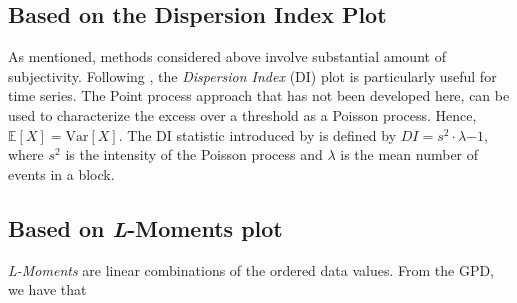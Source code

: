 




\subsection*{Based on the Dispersion Index Plot}

As mentioned, methods considered above involve substantial amount of subjectivity.
Following \citet{ribatet_users_2006}, the \emph{Dispersion Index} (DI) plot is particularly useful for time series. The Point process approach that has not been developed here, can be used to characterize the excess over a threshold as a Poisson process. Hence, $\mathbb{E}[X]=\text{Var}[X]$. The DI statistic introduced by \cite{cunnane_note_1979} is 
defined by $DI=s^2\cdot\lambda{-1}$, where $s^2$ is the intensity of the Poisson process and $\lambda$ is the mean number of events in a block.


\subsection*{Based on \emph{L}-Moments plot}

\emph{L-Moments} are linear combinations of the ordered data values. 
From the GPD, we have that

